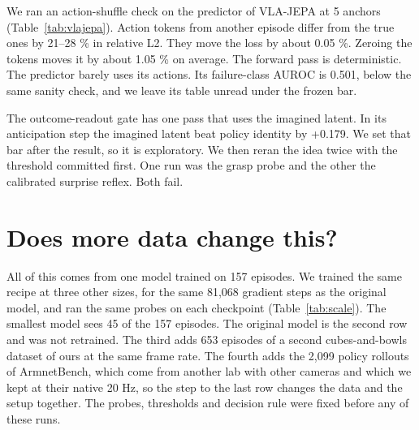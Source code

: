 \documentclass[10pt,twocolumn]{article}
\begin{document}
We ran an action-shuffle check on the predictor of VLA-JEPA at 5 anchors (Table~\ref{tab:vlajepa}). Action tokens from another episode differ from the true ones by 21--28 \% in relative L2. They move the loss by about 0.05 \%. Zeroing the tokens moves it by about 1.05 \% on average. The forward pass is deterministic. The predictor barely uses its actions. Its failure-class AUROC is 0.501, below the same sanity check, and we leave its table unread under the frozen bar.




\begin{table}[!t]\centering\setlength{\tabcolsep}{3pt}\scriptsize
\caption{VLA-JEPA world-model loss at 5 anchors with true, shuffled (Δ shuffled) and zeroed action tokens (exploratory spot check). The token change is the relative L2 of the shuffled tokens.}\label{tab:vlajepa}
\end{table}


The outcome-readout gate has one pass that uses the imagined latent. In its anticipation step the imagined latent beat policy identity by +0.179. We set that bar after the result, so it is exploratory. We then reran the idea twice with the threshold committed first. One run was the grasp probe and the other the calibrated surprise reflex. Both fail.


\section{Does more data change this?}


All of this comes from one model trained on 157 episodes. We trained the same recipe at three other sizes, for the same 81,068 gradient steps as the original model, and ran the same probes on each checkpoint (Table~\ref{tab:scale}). The smallest model sees 45 of the 157 episodes. The original model is the second row and was not retrained. The third adds 653 episodes of a second cubes-and-bowls dataset of ours at the same frame rate. The fourth adds the 2,099 policy rollouts of ArmnetBench, which come from another lab with other cameras and which we kept at their native 20 Hz, so the step to the last row changes the data and the setup together. The probes, thresholds and decision rule were fixed before any of these runs.
\end{document}
